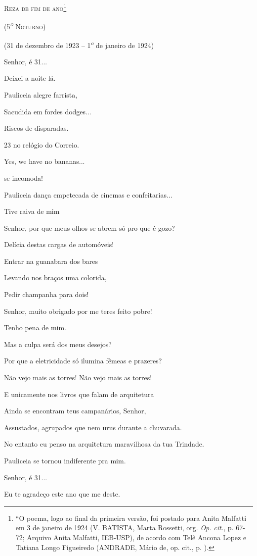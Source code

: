 \textsc{Reza de fim de ano}\footnote{``O poema, logo ao final da
  primeira versão, foi postado para Anita Malfatti em 3 de janeiro de
  1924 (V. BATISTA, Marta Rossetti, org. \emph{Op. cit.}, p. 67-72;
  Arquivo Anita Malfatti, IEB-USP), de acordo com Telê Ancona Lopez e
  Tatiana Longo Figueiredo (ANDRADE, Mário de, op. cit., p. ).}

\textsc{(5\textsuperscript{\emph{o}} Noturno)}

(31 de dezembro de 1923 -- 1\textsuperscript{\emph{o}} de janeiro de
1924)

Senhor, é 31...

Deixei a noite lá.

Pauliceia alegre farrista,

Sacudida em fordes dodges...

Riscos de disparadas.

23 no relógio do Correio.

Yes, we have no bananas...

se incomoda!

Pauliceia dança empetecada de cinemas e confeitarias...

Tive raiva de mim

Senhor, por que meus olhos se abrem só pro que é gozo?

Delícia destas cargas de automóveis!

Entrar na guanabara dos bares

Levando nos braços uma colorida,

Pedir champanha para dois!

Senhor, muito obrigado por me teres feito pobre!

Tenho pena de mim.

Mas a culpa será dos meus desejos?

Por que a eletricidade só ilumina fêmeas e prazeres?

Não vejo mais as torres! Não vejo mais as torres!

E unicamente nos livros que falam de arquitetura

Ainda se encontram teus campanários, Senhor,

Assustados, agrupados que nem urus durante a chuvarada.

No entanto eu penso na arquitetura maravilhosa da tua Trindade.

Pauliceia se tornou indiferente pra mim.

Senhor, é 31...

Eu te agradeço este ano que me deste.

